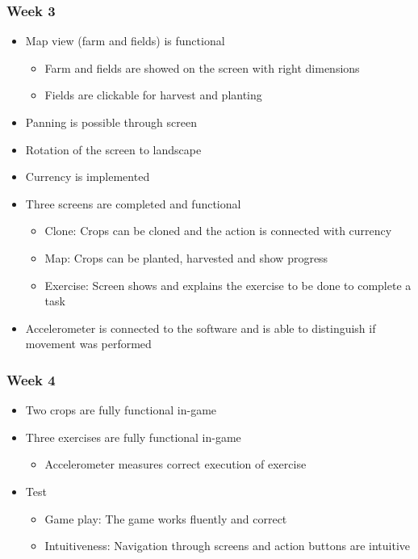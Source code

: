 \documentclass[a4paper,11pt,notitlepage]{report}
\begin{document}
\subsubsection{Week 3}
\begin{itemize}
\item Map view (farm and fields) is functional
\begin{itemize}
\item Farm and fields are showed on the screen with right dimensions
\item Fields are clickable for harvest and planting
\end{itemize}
\item Panning is possible through screen
\item Rotation of the screen to landscape
\item Currency is implemented
\item Three screens are completed and functional
\begin{itemize}
\item Clone: Crops can be cloned and the action is connected with currency
\item Map: Crops can be planted, harvested and show progress
\item Exercise: Screen shows and explains the exercise to be done to complete a task
\end{itemize}
\item Accelerometer is connected to the software and is able to distinguish if movement was performed
\end{itemize}
\subsubsection{Week 4}
\begin{itemize}
\item Two crops are fully functional in-game
\item Three exercises are fully functional in-game
\begin{itemize}
\item Accelerometer measures correct execution of exercise
\end{itemize}
\item Test
\begin{itemize}
\item Game play: The game works fluently and correct
\item Intuitiveness: Navigation through screens and action buttons are intuitive 
\end{itemize}
\end{itemize}
\end{document}
